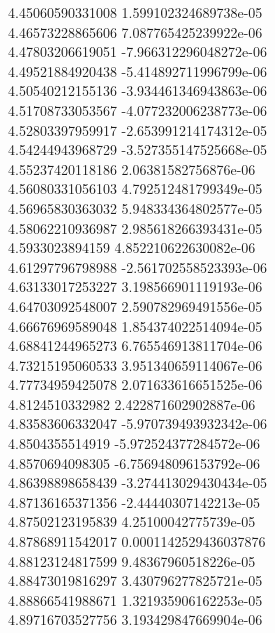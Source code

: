 {4.45060590331008 1.599102324689738e-05
 \\
4.46573228865606 7.087765425239922e-06
 \\
4.47803206619051 -7.966312296048272e-06
 \\
4.49521884920438 -5.414892711996799e-06
 \\
4.50540212155136 -3.934461346943863e-06
 \\
4.51708733053567 -4.077232006238773e-06
 \\
4.52803397959917 -2.653991214174312e-05
 \\
4.54244943968729 -3.527355147525668e-05
 \\
4.55237420118186 2.06381582756876e-06
 \\
4.56080331056103 4.792512481799349e-05
 \\
4.56965830363032 5.948334364802577e-05
 \\
4.58062210936987 2.985618266393431e-05
 \\
4.5933023894159 4.852210622630082e-06
 \\
4.61297796798988 -2.561702558523393e-06
 \\
4.63133017253227 3.198566901119193e-06
 \\
4.64703092548007 2.590782969491556e-05
 \\
4.66676969589048 1.854374022514094e-05
 \\
4.68841244965273 6.765546913811704e-06
 \\
4.73215195060533 3.951340659114067e-06
 \\
4.77734959425078 2.071633616651525e-06
 \\
4.8124510332982 2.422871602902887e-06
 \\
4.83583606332047 -5.970739493932342e-06
 \\
4.8504355514919 -5.972524377284572e-06
 \\
4.8570694098305 -6.756948096153792e-06
 \\
4.86398898658439 -3.274413029430434e-05
 \\
4.87136165371356 -2.44440307142213e-05
 \\
4.87502123195839 4.25100042775739e-05
 \\
4.87868911542017 0.0001142529436037876
 \\
4.88123124817599 9.48367960518226e-05
 \\
4.88473019816297 3.430796277825721e-05
 \\
4.88866541988671 1.321935906162253e-05
 \\
4.89716703527756 3.193429847669904e-06
}

